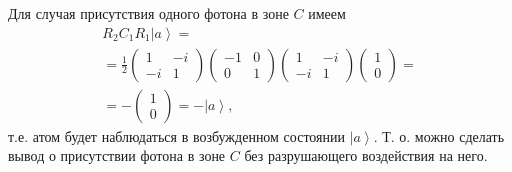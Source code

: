 Для случая присутствия одного фотона в зоне $C$ имеем
\begin{eqnarray}
  R_2 C_1 R_1 \left|a\right> =
  \nonumber \\
  =
  \frac{1}{2}
  \left(
  \begin{array} {cc}
    1 & -i
    \\
    -i & 1 
  \end{array}
  \right)
  \left(
  \begin{array} {cc}
    -1 & 0
    \\
    0 & 1 
  \end{array}
  \right)
  \left(
  \begin{array} {cc}
    1 & -i
    \\
    -i & 1 
  \end{array}
  \right)
  \left(
  \begin{array} {c}
    1
    \\
    0
  \end{array}
  \right) =
  \nonumber \\
  =
  - 
  \left(
  \begin{array} {c}
    1
    \\
    0
  \end{array}
  \right) =
  - \left|a\right>,
  \nonumber
\end{eqnarray}
т.е. атом будет наблюдаться в возбужденном состоянии
$\left|a\right>$. Т. о. можно сделать вывод о присутствии фотона в
зоне $C$ без разрушающего воздействия на него.



